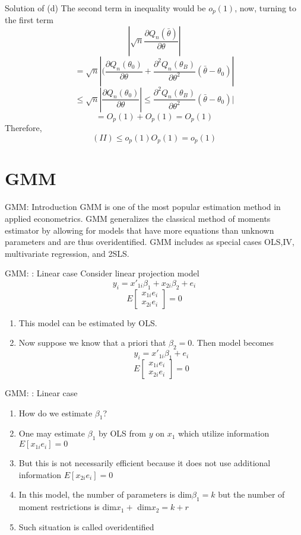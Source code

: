 \documentclass{beamer}
\begin{document}
\begin{frame}{Solution of (d)}
	The second term in inequality would be $o_p(1)$, now, turning to the first term
	\[|\sqrt{n}\frac{\partial Q_n(\bar{\theta})}{\partial \theta}|\]
\[ = \sqrt{n} |(\frac{\partial Q_n(\theta_0)}{\partial \theta} + \frac{\partial^2 Q_n(\theta_B)}{\partial \theta^2} (\bar{\theta} - \theta_0)|\]
\[\leq \sqrt{n} |\frac{\partial Q_n(\theta_0)}{\partial \theta}| \leq \frac{\partial^2 Q_n(\theta_B)}{\partial\theta^2} (\bar{\theta} - \theta_0)|\]
\[ = O_p(1) + O_p(1) = O_p(1)\]
Therefore,
\[(II) \leq o_p(1) O_p(1) = o_p(1)\]
\end{frame}

\section{GMM}
\begin{frame}{GMM: Introduction}
	GMM is one of the most popular estimation method in applied econometrics. GMM generalizes the classical method of moments estimator by allowing for models that have more equations than unknown parameters and are thus overidentified. GMM includes as special cases OLS,IV, multivariate regression, and 2SLS.  
\end{frame}
\begin{frame}{GMM: : Linear case}
	Consider linear projection model
	\[y_i = x'_{1i} \beta_1 + x_{2i} \beta_2 + e_i\]
	\[E\begin{bmatrix}
		x_{1i} e_i \\	
		x_{2i} e_i
		\end{bmatrix} =0
		\]
	\begin{enumerate}
		\item This model can be estimated by OLS.
		\item Now suppose we know that a priori that $\beta_2=0$. Then model becomes 
			\[y_i = x'_{1i} \beta_1 + e_i\]
			\[E \begin{bmatrix}
				x_{1i} e_i \\	
				x_{2i} e_i
				\end{bmatrix}
				=0\]
	\end{enumerate}
\end{frame}
\begin{frame}{GMM: : Linear case}
	\begin{enumerate}
			\item How do we estimate $\beta_1$?
			\item One may estimate $\beta_1$ by OLS from $y$ on $x_1$ which utilize information $E[x_{1i} e_i] = 0$
			\item But this is not necessarily efficient because it does not use additional information $E[x_{2i} e_i]=0$
			\item In this model, the number of parameters is dim$\beta_1 = k$ but the number of moment restrictions is dim$x_1+$ dim$x_2 = k+r$ 
			\item Such situation is called overidentified
	\end{enumerate}
\end{frame}
\end{document}
